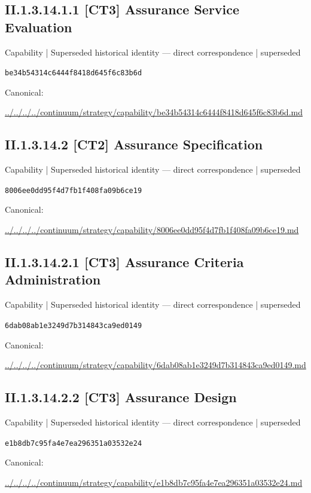 \documentclass[10pt,a4paper]{article}
\begin{document}
\subsection*{II.1.3.14.1.1 [CT3] Assurance Service Evaluation}
{\small Capability | Superseded historical identity — direct correspondence | superseded}\par
\texttt{be34b54314c6444f8418d645f6c83b6d}\par
Canonical: \par
{\footnotesize\url{../../../../continuum/strategy/capability/be34b54314c6444f8418d645f6c83b6d.md}}\par
\subsection*{II.1.3.14.2 [CT2] Assurance Specification}
{\small Capability | Superseded historical identity — direct correspondence | superseded}\par
\texttt{8006ee0dd95f4d7fb1f408fa09b6ce19}\par
Canonical: \par
{\footnotesize\url{../../../../continuum/strategy/capability/8006ee0dd95f4d7fb1f408fa09b6ce19.md}}\par
\subsection*{II.1.3.14.2.1 [CT3] Assurance Criteria Administration}
{\small Capability | Superseded historical identity — direct correspondence | superseded}\par
\texttt{6dab08ab1e3249d7b314843ca9ed0149}\par
Canonical: \par
{\footnotesize\url{../../../../continuum/strategy/capability/6dab08ab1e3249d7b314843ca9ed0149.md}}\par
\subsection*{II.1.3.14.2.2 [CT3] Assurance Design}
{\small Capability | Superseded historical identity — direct correspondence | superseded}\par
\texttt{e1b8db7c95fa4e7ea296351a03532e24}\par
Canonical: \par
{\footnotesize\url{../../../../continuum/strategy/capability/e1b8db7c95fa4e7ea296351a03532e24.md}}\par
\end{document}
